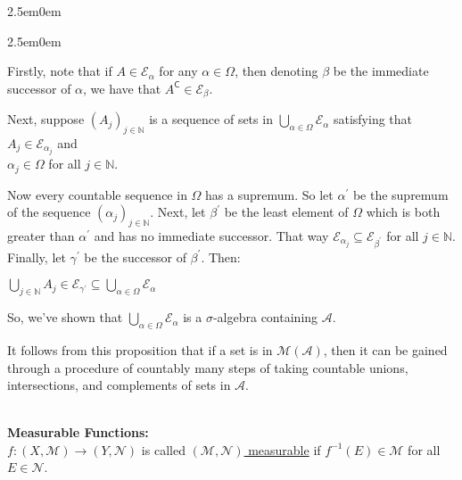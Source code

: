 \documentclass{book}
\newenvironment{myIndent}{%
   \begin{adjustwidth}{2.5em}{0em}%
}{%
   \end{adjustwidth}%
}
\newcommand{\udefine}[1]{{%
   \setulcolor{Red}%
   \setul{0.14em}{0.07em}%
   \ul{#1}%
}}
\newcommand{\blab}[1]{\textbf{#1}}
\newcommand{\comp}{\mathsf{C}}
\newcommand{\mySepTwo}[1][.]{%
   {\noindent\color{#1}{\rule{6.5in}{0.5mm}}}\\%
}
\newcommand{\retTwo}{\hfill\bigbreak}
\begin{document}
\begin{myIndent}
\begin{myIndent}
      Firstly, note that if $A \in \mathcal{E}_\alpha$ for any $\alpha \in \Omega$, then denoting $\beta$ be the immediate\\ successor of $\alpha$, we have that $A^\comp \in \mathcal{E}_\beta$.\retTwo

      Next, suppose $(A_j)_{j \in \mathbb{N}}$ is a sequence of sets in $\bigcup\limits_{\alpha \in \Omega}\mathcal{E}_\alpha$ satisfying that $A_j \in \mathcal{E}_{\alpha_j}$ and\\ [-6pt] $\alpha_j \in \Omega$ for all $j \in \mathbb{N}$.\retTwo

      Now every countable sequence in $\Omega$ has a supremum. So let $\alpha^\prime$ be the supremum of the sequence $(\alpha_j)_{j \in \mathbb{N}}$. Next, let $\beta^\prime$ be the least element of $\Omega$ which is both greater than $\alpha^\prime$ and has no immediate successor. That way $\mathcal{E}_{\alpha_j} \subseteq \mathcal{E}_{\beta^\prime}$ for all $j \in \mathbb{N}$. Finally, let $\gamma^\prime$ be the successor of $\beta^\prime$. Then:

      {\centering $\bigcup\limits_{j \in \mathbb{N}}A_j \in \mathcal{E}_{\gamma^\prime} \subseteq \bigcup\limits_{\alpha \in \Omega}\mathcal{E}_\alpha$ \retTwo\par}

      So, we've shown that $\bigcup\limits_{\alpha \in \Omega}\mathcal{E}_\alpha$ is a $\sigma$-algebra containing $\mathcal{A}$.\retTwo
   \end{myIndent}
\end{myIndent}

It follows from this proposition that if a set is in $\mathcal{M}(\mathcal{A})$, then it can be gained through a procedure of countably many steps of taking countable unions, intersections, and complements of sets in $\mathcal{A}$.

\mySepTwo 

\blab{Measurable Functions:}\\

$f: (X, \mathcal{M}) \longrightarrow (Y, \mathcal{N})$ is called \udefine{$(\mathcal{M}, \mathcal{N})$ measurable} if $f^{-1}(E) \in \mathcal{M}$ for all $E \in \mathcal{N}$.\retTwo
\end{document}
